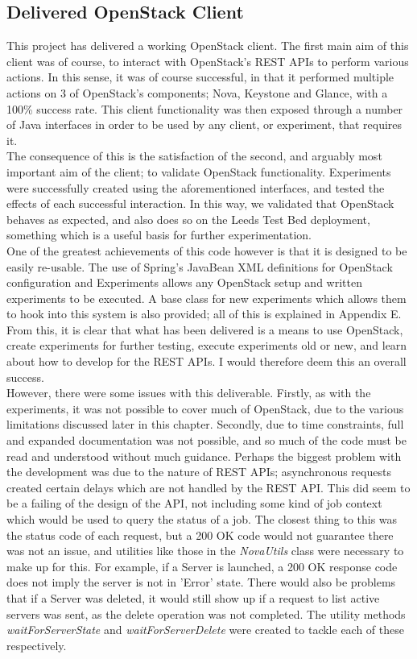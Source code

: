 \subsection{Delivered OpenStack Client}
This project has delivered a working OpenStack client. The first main aim of this client was of course, to interact with OpenStack's REST APIs to perform various actions. In this sense, it was of course successful, in that it performed multiple actions on 3 of OpenStack's components; Nova, Keystone and Glance, with a 100\% success rate. This client functionality was then exposed through a number of Java interfaces in order to be used by any client, or experiment, that requires it.\\
The consequence of this is the satisfaction of the second, and arguably most important aim of the client; to validate OpenStack functionality. Experiments were successfully created using the aforementioned interfaces, and tested the effects of each successful interaction. In this way, we validated that OpenStack behaves as expected, and also does so on the Leeds Test Bed deployment, something which is a useful basis for further experimentation. \\
One of the greatest achievements of this code however is that it is designed to be easily re-usable. The use of Spring's JavaBean XML definitions for OpenStack configuration and Experiments allows any OpenStack setup and written experiments to be executed. A base class for new experiments which allows them to hook into this system is also provided; all of this is explained in Appendix E. From this, it is clear that what has been delivered is a means to use OpenStack, create experiments for further testing, execute experiments old or new, and learn about how to develop for the REST APIs. I would therefore deem this an overall success. \\
However, there were some issues with this deliverable. Firstly, as with the  experiments, it was not possible to cover much of OpenStack, due to the various limitations discussed later in this chapter. Secondly, due to time constraints, full and expanded documentation was not possible, and so much of the code must be read and understood without much guidance.  Perhaps the biggest problem with the development was due to the nature of REST APIs; asynchronous requests created certain delays which are not handled by the REST API. This did seem to be a failing of the design of the API, not including some kind of job context which would be used to query the status of a job. The closest thing to this was the status code of each request, but a 200 OK code would not guarantee there was not an issue, and utilities like those in the \textit{NovaUtils} class were necessary to make up for this. For example, if a Server is launched, a 200 OK response code does not imply the server is not in 'Error' state. There would also be problems that if a Server was deleted, it would still show up if a request to list active servers was sent, as the delete operation was not completed. The utility methods \textit{waitForServerState} and \textit{waitForServerDelete} were created to tackle each of these respectively.

